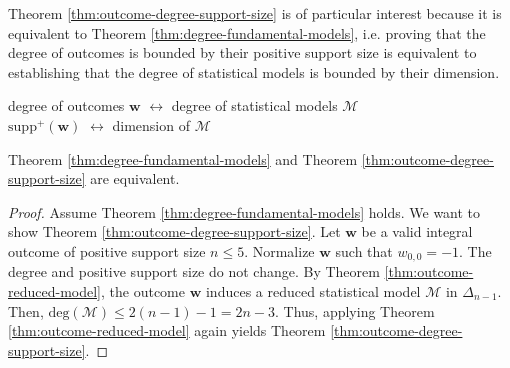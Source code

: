 Theorem \ref{thm:outcome-degree-support-size} is of particular interest because it is equivalent to Theorem \ref{thm:degree-fundamental-models}, i.e. proving that the degree of outcomes is bounded by their positive support size is equivalent to establishing that the degree of statistical models is bounded by their dimension.

\begin{center}
    degree of outcomes \( \mathbf{w} \) \( \longleftrightarrow \) degree of statistical models \( \mathcal{M} \) \\
    \( \mathrm{supp}^+(\mathbf w) \) \( \longleftrightarrow \) dimension of \( \mathcal{M} \)
\end{center}

\begin{proposition}
    Theorem \ref{thm:degree-fundamental-models} and Theorem \ref{thm:outcome-degree-support-size} are equivalent.
\end{proposition}

\begin{proof}
    Assume Theorem \ref{thm:degree-fundamental-models} holds. We want to show Theorem \ref{thm:outcome-degree-support-size}. Let \( \mathbf{w} \) be a valid integral outcome of positive support size \( n \leq 5 \). Normalize \( \mathbf{w} \) such that \( w_{0,0} = -1 \). The degree and positive support size do not change. By Theorem \ref{thm:outcome-reduced-model}, the outcome \( \mathbf{w} \) induces a reduced statistical model \( \mathcal{M} \) in \( \Delta_{n-1} \). Then, \( \mathrm{deg}(\mathcal{M}) \leq 2(n-1) -1 = 2n - 3\). Thus, applying Theorem \ref{thm:outcome-reduced-model} again yields Theorem \ref{thm:outcome-degree-support-size}.
\end{proof}